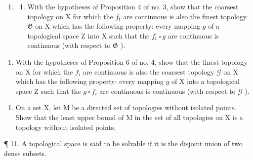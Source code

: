 \begin{enumerate}
\def\labelenumi{\arabic{enumi})}
\setcounter{enumi}{8}
\tightlist
\item
  \begin{enumerate}
  \def\labelenumii{\alph{enumii})}
  \tightlist
  \item
    With the hypotheses of Proposition 4 of no. 3, show that the coarsest topology on X for which the \(f_{t}\) are continuous is also the finest topology \(\mathfrak{G}\) on X which has the following property: every mapping \(g\) of a topological space Z into X such that the \(f_{t} \circ g\) are continuous is continuous (with respect to \(\mathfrak{G}\) ).
  \end{enumerate}
\end{enumerate}

\begin{enumerate}
\def\labelenumi{\alph{enumi})}
\setcounter{enumi}{1}
\tightlist
\item
  With the hypotheses of Proposition 6 of no. 4, show that the finest topology on X for which the \(f_{i}\) are continuous is also the coarsest topology \(\mathcal{G}\) on X which has the following property: every mapping \(g\) of X into a topological space Z such that the \(g \circ f_{i}\) are continuous is continuous (with respect to \(\mathcal{G}\) ).
\end{enumerate}

\begin{enumerate}
\def\labelenumi{\arabic{enumi}.}
\setcounter{enumi}{9}
\tightlist
\item
  On a set X, let M be a directed set of topologies without isolated points. Show that the least upper bound of M in the set of all topologies on X is a topology without isolated points.
\end{enumerate}

¶ 11. A topological space is said to be solvable if it is the disjoint union of two dense subsets.

